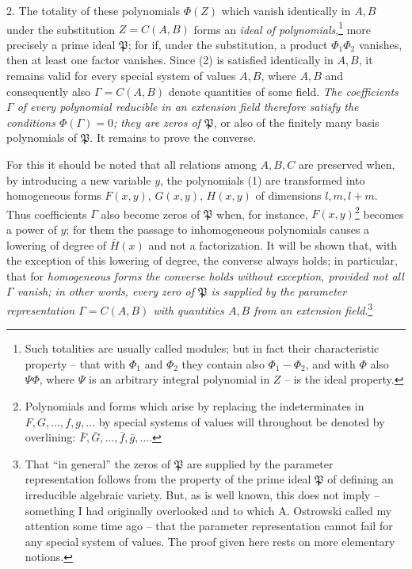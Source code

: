 2. The totality of these polynomials $\Phi(Z)$ which vanish identically in $A,B$ under the substitution $Z=C(A,B)$ forms an \emph{ideal of polynomials},\footnote{Such totalities are usually called modules; but in fact their characteristic property -- that with $\Phi_1$ and $\Phi_2$ they contain also $\Phi_1-\Phi_2$, and with $\Phi$ also $\Psi\Phi$, where $\Psi$ is an arbitrary integral polynomial in $Z$ -- is the ideal property.} more precisely a prime ideal $\mathfrak P$; for if, under the substitution, a product $\Phi_1\Phi_2$ vanishes, then at least one factor vanishes. Since (2) is satisfied identically in $A,B$, it remains valid for every special system of values $A,B$, where $A,B$ and consequently also $\Gamma=C(A,B)$ denote quantities of some field. \emph{The coefficients $\Gamma$ of every polynomial reducible in an extension field therefore satisfy the conditions $\Phi(\Gamma)=0$; they are zeros of $\mathfrak P$,} or also of the finitely many basis polynomials of $\mathfrak P$. It remains to prove the converse.

For this it should be noted that all relations among $A,B,C$ are preserved when, by introducing a new variable $y$, the polynomials (1) are transformed into homogeneous forms $F(x,y)$, $G(x,y)$, $H(x,y)$ of dimensions $l,m,l+m$. Thus coefficients $\Gamma$ also become zeros of $\mathfrak P$ when, for instance, $F(x,y)$\footnote{Polynomials and forms which arise by replacing the indeterminates in $F,G,\ldots,f,g,\ldots$ by special systems of values will throughout be denoted by overlining: $\bar F,\bar G,\ldots,\bar f,\bar g,\ldots$.} becomes a power of $y$; for them the passage to inhomogeneous polynomials causes a lowering of degree of $\bar H(x)$ and not a factorization. It will be shown that, with the exception of this lowering of degree, the converse always holds; in particular, that for \emph{homogeneous forms the converse holds without exception, provided not all $\Gamma$ vanish; in other words, every zero of $\mathfrak P$ is supplied by the parameter representation $\Gamma=C(A,B)$ with quantities $A,B$ from an extension field}.\footnote{That ``in general'' the zeros of $\mathfrak P$ are supplied by the parameter representation follows from the property of the prime ideal $\mathfrak P$ of defining an irreducible algebraic variety. But, as is well known, this does not imply -- something I had originally overlooked and to which A. Ostrowski called my attention some time ago -- that the parameter representation cannot fail for any special system of values. The proof given here rests on more elementary notions.}

